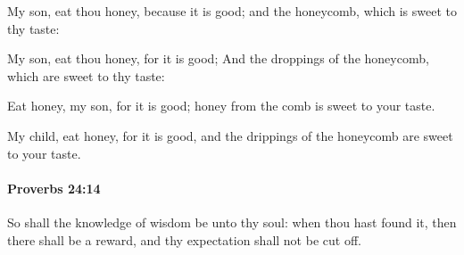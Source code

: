 			My son, eat thou honey, because it is good; and the honeycomb, which is sweet to thy taste:

			\begin{versebox}
					\item[BHS] 
					\item[ASV] My son, eat thou honey, for it is good; And the droppings of the honeycomb, which are sweet to thy taste:
					\item[NIV] Eat honey, my son, for it is good; honey from the comb is sweet to your taste.
					\item[NRSV] My child, eat honey, for it is good, and the drippings of the honeycomb are sweet to your taste.
			\end{versebox}

		\paragraph{Proverbs 24:14} %
			\label{PROVERBS-24-14}

			So shall the knowledge of wisdom be unto thy soul: when thou hast found it, then there shall be a reward, and thy expectation shall not be cut off.

